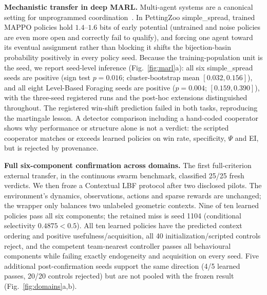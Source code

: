 \documentclass[11pt]{article}
\theoremstyle{definition}
\begin{document}
\textbf{Mechanistic transfer in deep MARL.}
Multi-agent systems are a canonical setting for unprogrammed
coordination~\cite{rashid2018,samvelyan2019,terry2021,carroll2019,baker2020}.
In PettingZoo simple\_spread, trained MAPPO policies hold
$1.4$--$1.6$ bits of early potential (untrained and noise policies are
even more open and correctly fail to qualify), and forcing one agent
toward its eventual assignment rather than blocking it shifts the
bijection-basin probability positively in every policy seed. Because
the training-population unit is the seed, we report seed-level
inference (Fig.~\ref{fig:marl}a): all six simple\_spread seeds are
positive (sign test $p=0.016$; cluster-bootstrap mean
$[0.032,0.156]$), and all eight Level-Based Foraging seeds are
positive ($p=0.004$; $[0.159,0.390]$), with the three-seed registered
runs and the post-hoc extensions distinguished throughout. The
registered win-shift prediction failed in both tasks, reproducing the
martingale lesson. A detector comparison including a hand-coded
cooperator shows why performance or structure alone is not a verdict:
the scripted cooperator matches or exceeds learned policies on win
rate, specificity, $\Psi$ and EI, but is rejected by provenance.

\textbf{Full six-component confirmation across domains.}
The first full-criterion external transfer, in the continuous swarm
benchmark, classified 25/25 fresh verdicts. We then froze a Contextual
LBF protocol after two disclosed pilots. The environment's dynamics,
observations, actions and sparse rewards are unchanged; the wrapper only
balances two unlabeled geometric contexts. Nine of ten learned policies
pass all six components; the retained miss is seed 1104
(conditional selectivity $0.4875<0.5$). All ten learned policies have
the predicted context ordering and positive usefulness/acquisition, all
40 initialization/scripted controls reject, and the competent
team-nearest controller passes all behavioural components while failing
exactly endogeneity and acquisition on every seed. Five additional
post-confirmation seeds support the same direction (4/5 learned passes,
20/20 controls rejected) but are not pooled with the frozen result
(Fig.~\ref{fig:domains}a,b).
\end{document}

